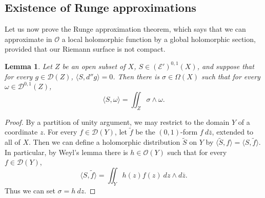 \documentclass[reqno,12pt,letterpaper]{amsart}
\newcommand{\Olo}{\mathscr O}
\newcommand{\Smooth}{\mathscr E}
\newcommand{\Test}{\mathscr D}
\newtheorem{lemma}[theorem]{Lemma}
\theoremstyle{definition}
\begin{document}
\subsection{Existence of Runge approximations}
Let us now prove the Runge approximation theorem, which says that we can approximate in $\Olo$ a local holomorphic function by a global holomorphic section, provided that our Riemann surface is not compact.

\begin{lemma}
\label{compactly supported holomorphic}
Let $Z$ be an open subset of $X$, $S \in (\Smooth')^{0,1}(X)$, and suppose that for every $g \in \Test(Z)$, $\langle S, d''g\rangle = 0$. Then there is $\sigma \in \Omega(X)$ such that for every $\omega \in \Test^{0,1}(Z)$,
$$\langle S, \omega\rangle = \iint_Z \sigma \wedge \omega.$$
\end{lemma}
\begin{proof}
By a partition of unity argument, we may restrict to the domain $Y$ of a coordinate $z$.
For every $f \in \Test(Y)$, let $\tilde f$ be the $(0,1)$-form $f ~d\overline z$, extended to all of $X$.
Then we can define a holomorphic distribution $\tilde S$ on $Y$ by $\langle \tilde S, f\rangle = \langle S, \tilde f\rangle$.
In particular, by Weyl's lemma there is $h \in \Olo(Y)$ such that for every $f \in \Test(Y)$,
$$\langle S, \tilde f\rangle = \iint_Y h(z)f(z) ~dz \wedge d\overline z.$$
Thus we can set $\sigma = h~dz$.
\end{proof}
\end{document}
